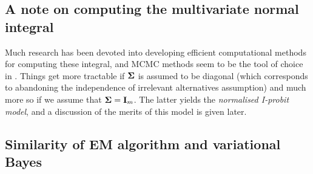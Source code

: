 \subsection{A note on computing the multivariate normal integral}
\label{misc:mnint}


Much research has been devoted into developing efficient computational methods for computing these integral, and MCMC methods seem to be the tool of choice in \citep{mcculloch1994exact,nobile1998hybrid,mcculloch2000bayesian}.
Things get more tractable if ${\bm\Sigma}$ is assumed to be diagonal (which corresponds to abandoning the independence of irrelevant alternatives assumption) and much more so if we assume that ${\bm\Sigma} = {\mathbf I}_m$.
The latter yields the \emph{normalised I-probit model}, and a discussion of the merits of this model is given later.




\subsection{Similarity of EM algorithm and variational Bayes}